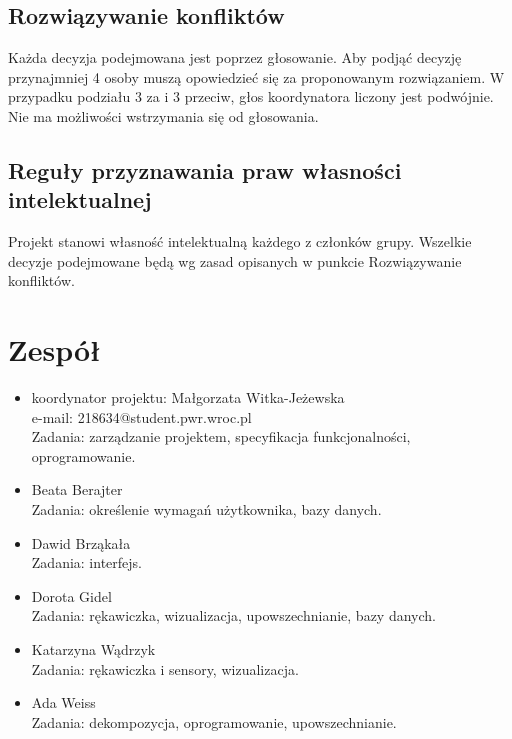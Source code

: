 \documentclass{article}
\begin{document}
\subsection{Rozwiązywanie konfliktów}
Każda decyzja podejmowana jest poprzez głosowanie. Aby podjąć decyzję przynajmniej 4 osoby muszą opowiedzieć się za proponowanym rozwiązaniem. W przypadku podziału 3 za i 3 przeciw, głos koordynatora liczony jest podwójnie. Nie ma możliwości wstrzymania się od głosowania.
\subsection{Reguły przyznawania praw własności intelektualnej}
Projekt stanowi własność intelektualną każdego z członków grupy. Wszelkie decyzje podejmowane będą wg zasad opisanych w punkcie Rozwiązywanie konfliktów.
\section{Zespół}
\begin{itemize}
\item koordynator projektu: Małgorzata Witka-Jeżewska\\e-mail: 218634@student.pwr.wroc.pl\\
Zadania: zarządzanie projektem, specyfikacja funkcjonalności, oprogramowanie.
\item Beata Berajter \\
Zadania: określenie wymagań użytkownika, bazy danych.
\item Dawid Brząkała \\
Zadania: interfejs.
\item Dorota Gidel \\
Zadania: rękawiczka, wizualizacja, upowszechnianie, bazy danych.
\item Katarzyna Wądrzyk \\
Zadania: rękawiczka i sensory, wizualizacja.
\item Ada Weiss \\
Zadania: dekompozycja, oprogramowanie, upowszechnianie.
\end{itemize}
\end{document}
